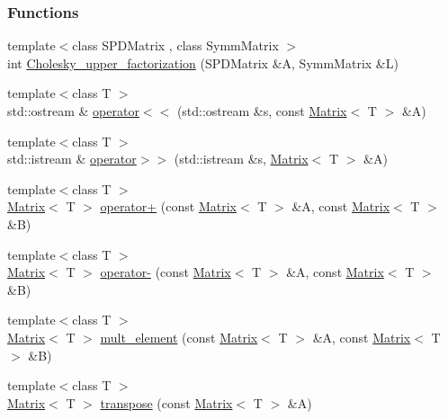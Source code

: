 \subsubsection*{Functions}
\begin{DoxyCompactItemize}
\item 
{\footnotesize template$<$class SPDMatrix , class SymmMatrix $>$ }\\int \hyperlink{namespace_t_n_t_a01238ecda241d07a17451de581788862}{Cholesky\_\-upper\_\-factorization} (SPDMatrix \&A, SymmMatrix \&L)
\item 
{\footnotesize template$<$class T $>$ }\\std::ostream \& \hyperlink{namespace_t_n_t_adeecd24f6af848eafc643c71ea35ea7f}{operator$<$$<$} (std::ostream \&s, const \hyperlink{class_t_n_t_1_1_matrix}{Matrix}$<$ T $>$ \&A)
\item 
{\footnotesize template$<$class T $>$ }\\std::istream \& \hyperlink{namespace_t_n_t_ab9878fdc8dd7301c74dde5cf367f07bf}{operator$>$$>$} (std::istream \&s, \hyperlink{class_t_n_t_1_1_matrix}{Matrix}$<$ T $>$ \&A)
\item 
{\footnotesize template$<$class T $>$ }\\\hyperlink{class_t_n_t_1_1_matrix}{Matrix}$<$ T $>$ \hyperlink{namespace_t_n_t_a7652f9afa5f942b3484a18b332676ff8}{operator+} (const \hyperlink{class_t_n_t_1_1_matrix}{Matrix}$<$ T $>$ \&A, const \hyperlink{class_t_n_t_1_1_matrix}{Matrix}$<$ T $>$ \&B)
\item 
{\footnotesize template$<$class T $>$ }\\\hyperlink{class_t_n_t_1_1_matrix}{Matrix}$<$ T $>$ \hyperlink{namespace_t_n_t_a05ffa4c326c0f51ef4e2c2be9abde552}{operator-\/} (const \hyperlink{class_t_n_t_1_1_matrix}{Matrix}$<$ T $>$ \&A, const \hyperlink{class_t_n_t_1_1_matrix}{Matrix}$<$ T $>$ \&B)
\item 
{\footnotesize template$<$class T $>$ }\\\hyperlink{class_t_n_t_1_1_matrix}{Matrix}$<$ T $>$ \hyperlink{namespace_t_n_t_a39160bf84e65a9034369c1072456e83e}{mult\_\-element} (const \hyperlink{class_t_n_t_1_1_matrix}{Matrix}$<$ T $>$ \&A, const \hyperlink{class_t_n_t_1_1_matrix}{Matrix}$<$ T $>$ \&B)
\item 
{\footnotesize template$<$class T $>$ }\\\hyperlink{class_t_n_t_1_1_matrix}{Matrix}$<$ T $>$ \hyperlink{namespace_t_n_t_aa97b646045595ba4d4a4b92fcc866cf8}{transpose} (const \hyperlink{class_t_n_t_1_1_matrix}{Matrix}$<$ T $>$ \&A)

\end{DoxyCompactItemize}
